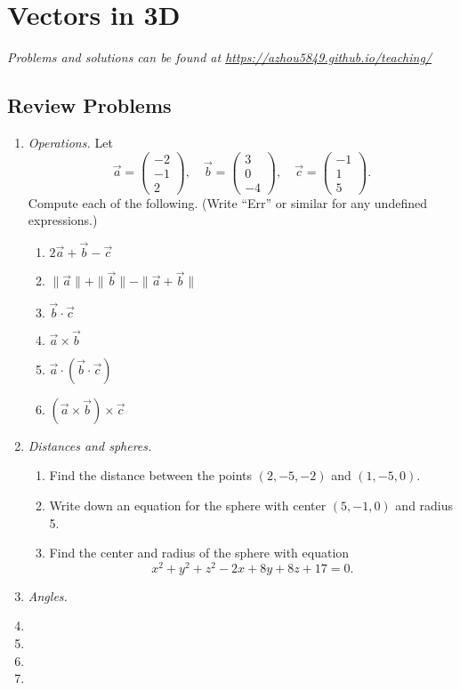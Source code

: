 \section{Vectors in 3D}

\emph{Problems and solutions can be found at \url{https://azhou5849.github.io/teaching/}}

\subsection{Review Problems}

\begin{enumerate}
\item \emph{Operations.} Let
\begin{equation*}
\vec{a} = \begin{pmatrix} -2 \\ -1 \\ 2 \end{pmatrix},\quad\vec{b} = \begin{pmatrix} 3 \\ 0 \\ -4 \end{pmatrix},\quad\vec{c} = \begin{pmatrix} -1 \\ 1 \\ 5 \end{pmatrix}.
\end{equation*}
Compute each of the following. (Write ``Err'' or similar for any undefined expressions.)
\begin{multicols}{2}
\begin{enumerate}
\item $2\vec{a} + \vec{b} - \vec{c}$
\item $\|\vec{a}\| + \|\vec{b}\| - \|\vec{a} + \vec{b}\|$
\item $\vec{b}\cdot\vec{c}$
\item $\vec{a}\times\vec{b}$
\item $\vec{a}\cdot (\vec{b}\cdot\vec{c})$
\item $(\vec{a}\times\vec{b})\times\vec{c}$
\end{enumerate}
\end{multicols}
\item \emph{Distances and spheres.} 
\begin{enumerate}
\item Find the distance between the points $(2, -5, -2)$ and $(1, -5, 0)$.
\item Write down an equation for the sphere with center $(5, -1, 0)$ and radius 5.
\item Find the center and radius of the sphere with equation
\begin{equation*}
x^2 + y^2 + z^2 - 2x + 8y + 8z + 17 = 0.
\end{equation*}
\end{enumerate}
\item \emph{Angles.} 
\item %
\item %
\item %
\item %
\end{enumerate}


